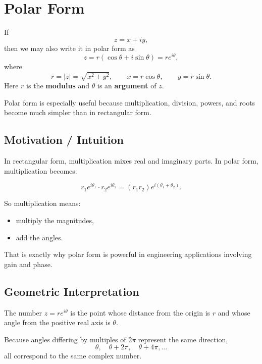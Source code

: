 
\section{Polar Form}

\begin{conceptbox}
    If
    \[
        z=x+iy,
    \]
    then we may also write it in polar form as
    \[
        z=r(\cos\theta+i\sin\theta)=re^{i\theta},
    \]
    where
    \[
        r=|z|=\sqrt{x^2+y^2},
        \qquad
        x=r\cos\theta,
        \qquad
        y=r\sin\theta.
    \]
    Here $r$ is the \textbf{modulus} and $\theta$ is an \textbf{argument} of $z$.
\end{conceptbox}

Polar form is especially useful because multiplication, division, powers, and roots become much simpler than in rectangular form.

\subsection*{Motivation / Intuition}

In rectangular form, multiplication mixes real and imaginary parts. In polar form, multiplication becomes:

\[
    r_1e^{i\theta_1}\cdot r_2e^{i\theta_2}
    =
    (r_1r_2)e^{i(\theta_1+\theta_2)}.
\]

So multiplication means:

\begin{itemize}
    \item multiply the magnitudes,
    \item add the angles.
\end{itemize}

That is exactly why polar form is powerful in engineering applications involving gain and phase.

\subsection*{Geometric Interpretation}

The number $z=re^{i\theta}$ is the point whose distance from the origin is $r$ and whose angle from the positive real axis is $\theta$.

Because angles differing by multiples of $2\pi$ represent the same direction,
\[
    \theta,\quad \theta+2\pi,\quad \theta+4\pi,\dots
\]
all correspond to the same complex number.

